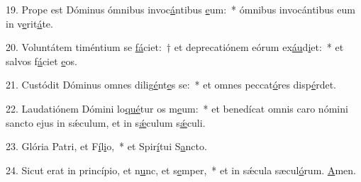 19. Prope est Dóminus ómnibus invoc\uline{á}ntibus \uline{e}um:~* ómnibus invocántibus eum in v\uline{e}rit\uline{á}te.\par 
20. Voluntátem timéntium se \uline{fá}ciet:~† et deprecatiónem eórum ex\uline{áu}d\uline{i}et:~* et salvos f\uline{á}ciet \uline{e}os.\par 
21. Custódit Dóminus omnes dilig\uline{é}nt\uline{e}s se:~* et omnes peccat\uline{ó}res disp\uline{é}rdet.\par 
22. Laudatiónem Dómini lo\uline{qué}tur os m\uline{e}um:~* et benedícat omnis caro nómini sancto ejus in sǽculum, et in s\uline{ǽ}culum s\uline{ǽ}culi.\par 
23. Glória Patri, et F\uline{í}l\uline{i}o,~* et Spir\uline{í}tui S\uline{a}ncto.\par 
24. Sicut erat in princípio, et n\uline{u}nc, et s\uline{e}mper,~* et in sǽcula sæcul\uline{ó}rum. \uline{A}men.\par 
